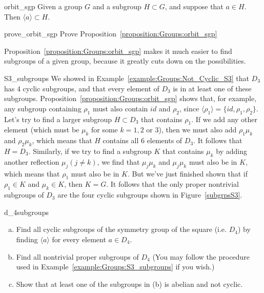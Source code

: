 \begin{prop}{orbit_sgp}
Given a group $G$ and a subgroup $H \subset G$, and suppose that $a \in H$.  Then $\langle a \rangle \subset H$.
\end{prop}

\begin{exercise}{prove_orbit_sgp}
Prove Proposition~\ref{proposition:Groups:orbit_sgp}
\end{exercise}

Proposition~\ref{proposition:Groups:orbit_sgp} makes it much easier to find subgroups of a given group, because it greatly cuts down
on the possibilities.

\begin{example}{S3_subgroups}
We showed in Example~\ref{example:Groups:Not_Cyclic_S3} that $D_3$ has 4 cyclic subgroups, and that every element of $D_3$ is in at least one of these subgroups.  Proposition~\ref{proposition:Groups:orbit_sgp} shows that, for example, any subgroup containing $\rho_1$ must also contain $id$ and  $\rho_2$, since $\langle \rho_1 \rangle = \{id, \rho_1, \rho_2\}$.  Let's try to find a larger subgroup $H \subset D_3$ that contains $\rho_1$.  If we add any other element  (which must be  $\mu_k$ for some $k=1,2$ or $3$), then we must also add $\rho_1 \mu_k$ and $\rho_2 \mu_k$, which means that $H$ contains  all 6 elements of $D_3$. It follows that $H=D_3$. Similarly, if we try to find a subgroup $K$ that contains $\mu_k$ by adding another reflection $\mu_j (j \neq k)$, we find that $\mu_j \mu_k$ and $\mu_j \mu_k$  must also be in $K$, which means that $\rho_1$ must also be in $K$. But we've just finished shown that if $\rho_1 \in K$ and $\mu_k \in K$, then  $K=G$.  It follows that the only proper nontrivial subgroups of $D_3$ are the four cyclic subgroups shown in Figure~\ref{subgrpsS3}.
\end{example}

\begin{exercise}{d_4subgroups}
\begin{enumerate}[(a)]
\item
Find all cyclic subgroups of  the symmetry group of the square (i.e. $D_4$)  by finding $\langle a \rangle$ for every element $a \in D_4$.
\item
Find all nontrivial proper subgroups of $D_4$  (You may follow the procedure used in Example~\ref{example:Groups:S3_subgroups} if you wish.) 
\item
Show that at least one of the subgroups in (b)  is abelian and not cyclic.
\end{enumerate}
\end{exercise}      

